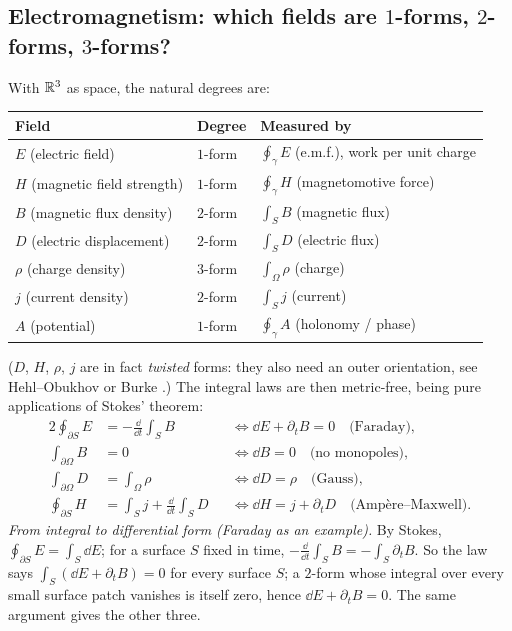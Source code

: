 \subsection{Electromagnetism: which fields are $1$-forms, $2$-forms, $3$-forms?}\label{sec:phys-em}

With $\mathbb{R}^3$ as space, the natural degrees are:
\begin{center}
\small
\renewcommand{\arraystretch}{1.3}
\begin{tabular}{@{}p{5.2cm}p{1.8cm}p{6.0cm}@{}}
\toprule
\textbf{Field} & \textbf{Degree} & \textbf{Measured by}\\
\midrule
$E$ (electric field) & $1$-form & $\oint_\gamma E$ (e.m.f.), work per unit charge\\
$H$ (magnetic field strength) & $1$-form & $\oint_\gamma H$ (magnetomotive force)\\
$B$ (magnetic flux density) & $2$-form & $\int_SB$ (magnetic flux)\\
$D$ (electric displacement) & $2$-form & $\int_SD$ (electric flux)\\
$\rho$ (charge density) & $3$-form & $\int_\Omega\rho$ (charge)\\
$j$ (current density) & $2$-form & $\int_Sj$ (current)\\
$A$ (potential) & $1$-form & $\oint_\gamma A$ (holonomy / phase)\\
\bottomrule
\end{tabular}
\end{center}
($D$, $H$, $\rho$, $j$ are in fact \emph{twisted} forms: they also need an outer orientation, see Hehl--Obukhov \cite{HehlObukhov} or Burke \cite{Burke}.) The integral laws are then metric-free, being pure applications of Stokes' theorem:
\begin{alignat*}{2}
\oint_{\partial S}E&=-\frac{\dd}{\dd t}\int_SB&&\iff\dd E+\partial_tB=0\quad\text{(Faraday),}\\
\int_{\partial\Omega}B&=0&&\iff\dd B=0\quad\text{(no monopoles),}\\
\int_{\partial\Omega}D&=\int_\Omega\rho&&\iff\dd D=\rho\quad\text{(Gauss),}\\
\oint_{\partial S}H&=\int_Sj+\frac{\dd}{\dd t}\int_SD&&\iff\dd H=j+\partial_tD\quad\text{(Amp\`ere--Maxwell).}
\end{alignat*}
\emph{From integral to differential form (Faraday as an example).} By Stokes, $\oint_{\partial S}E=\int_S\dd E$; for a surface $S$ fixed in time, $-\frac{\dd}{\dd t}\int_SB=-\int_S\partial_tB$. So the law says $\int_S(\dd E+\partial_tB)=0$ for every surface $S$; a $2$-form whose integral over every small surface patch vanishes is itself zero, hence $\dd E+\partial_tB=0$. The same argument gives the other three.

